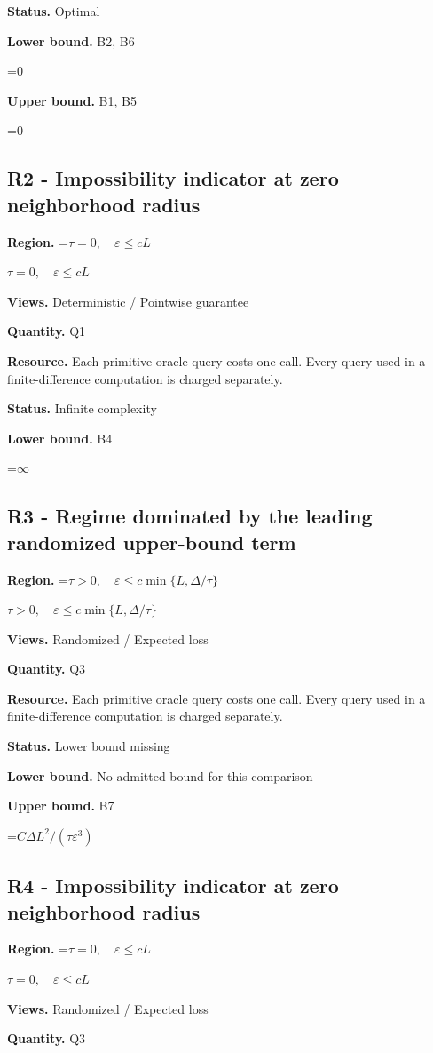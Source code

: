 \documentclass[10pt,a4paper]{article}
\newcommand{\AtlasMath}[1]{\par\begingroup\centering\setbox0=\hbox{$\displaystyle #1$}\ifdim\wd0>1.4\linewidth\typeout{ATLAS WIDE FORMULA: \the\wd0}\fi\ifdim\wd0>\linewidth\resizebox{\linewidth}{!}{\box0}\else\box0\fi\par\endgroup}
\newcommand{\AtlasInlineMath}[1]{\begingroup\setbox0=\hbox{$#1$}\ifdim\wd0>.4\linewidth\endgroup\AtlasMath{#1}\else\endgroup$#1$\fi}
\begin{document}
\textbf{Status.} Optimal

\textbf{Lower bound.} B2, B6

\AtlasMath{0}
\textbf{Upper bound.} B1, B5

\AtlasMath{0}
\subsection{R2 - Impossibility indicator at zero neighborhood radius}
\textbf{Region.} \AtlasInlineMath{\tau=0,\quad\varepsilon\le cL}

\textbf{Views.} Deterministic / Pointwise guarantee

\textbf{Quantity.} Q1

\textbf{Resource.} Each primitive oracle query costs one call. Every query used in a finite-difference computation is charged separately.

\textbf{Status.} Infinite complexity

\textbf{Lower bound.} B4

\AtlasMath{\infty}
\subsection{R3 - Regime dominated by the leading randomized upper-bound term}
\textbf{Region.} \AtlasInlineMath{\tau>0,\quad\varepsilon\le c\min\{L,\Delta/\tau\}}

\textbf{Views.} Randomized / Expected loss

\textbf{Quantity.} Q3

\textbf{Resource.} Each primitive oracle query costs one call. Every query used in a finite-difference computation is charged separately.

\textbf{Status.} Lower bound missing

\textbf{Lower bound.} No admitted bound for this comparison

\textbf{Upper bound.} B7

\AtlasMath{C\Delta L^2/(\tau\varepsilon^3)}
\subsection{R4 - Impossibility indicator at zero neighborhood radius}
\textbf{Region.} \AtlasInlineMath{\tau=0,\quad\varepsilon\le cL}

\textbf{Views.} Randomized / Expected loss

\textbf{Quantity.} Q3
\end{document}

